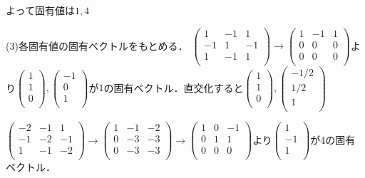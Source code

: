 \documentclass[
		book,
		head_space=20mm,
		foot_space=20mm,
		gutter=10mm,
		line_length=190mm
]{jlreq}
\begin{document}
よって固有値は$1,4$

(3)各固有値の固有ベクトルをもとめる．
$\begin{pmatrix}
    1 & -1 & 1\\
    -1 & 1 & -1 \\
    1 & -1 & 1\\
\end{pmatrix}\to \begin{pmatrix}
    1 & -1 & 1\\
    0 & 0 & 0 \\
    0 & 0 & 0\\
\end{pmatrix}$より$\begin{pmatrix}
    1 \\
    1 \\
    0\\
\end{pmatrix},\begin{pmatrix}
    -1 \\
    0 \\
    1 \\
\end{pmatrix}$が$1$の固有ベクトル．直交化すると$\begin{pmatrix}
    1 \\
    1 \\
    0\\
\end{pmatrix},\begin{pmatrix}
    -1/2 \\
    1/2 \\
    1 \\
\end{pmatrix}$

$\begin{pmatrix}
    -2 & -1 & 1\\
    -1 & -2 & -1 \\
    1 & -1 & -2\\
\end{pmatrix}\to\begin{pmatrix}
    1 & -1 & -2\\
    0 & -3 & -3 \\
    0 & -3 & -3 \\
\end{pmatrix}\to\begin{pmatrix}
    1 & 0 & -1 \\
    0 & 1 & 1\\
    0 & 0 & 0\\
\end{pmatrix}$より$\begin{pmatrix}
    1\\
    -1\\
    1\\
\end{pmatrix}$が$4$の固有ベクトル．
\end{document}
